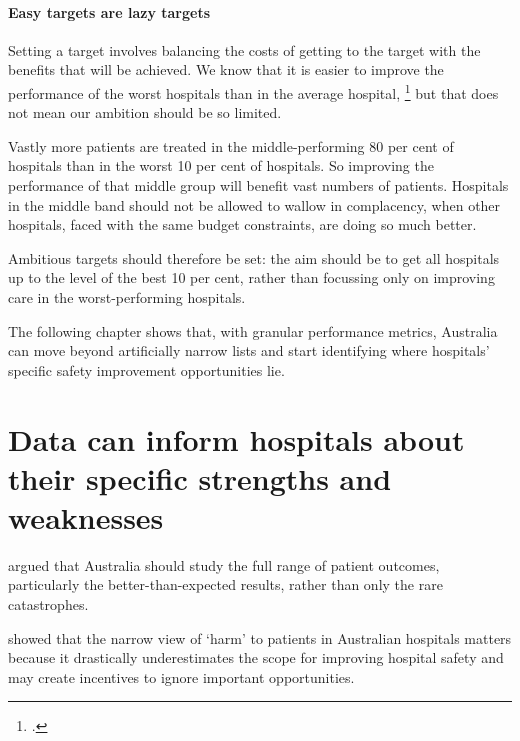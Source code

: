 \documentclass[FrontPage]{grattan}
\begin{document}
\subsubsection{Easy targets are lazy targets}\label{subsubsec:easy-targets-are-lazy-targets}

Setting a target involves balancing the costs of getting to the target with the benefits that will be achieved.
We know that it is easier to improve the performance of the worst hospitals than in the average hospital,%
	\footcites{Ivers_2012}{Mendelson_2017}
but that does not mean our ambition should be so limited.

Vastly more patients are treated in the middle-performing 80 per cent of hospitals than in the worst 10 per cent of hospitals.
So improving the performance of that middle group will benefit vast numbers of patients. 
Hospitals in the middle band should not be allowed to wallow in complacency, when other hospitals, faced with the same budget constraints, are doing so much better.

Ambitious targets should therefore be set: the aim should be to get all hospitals up to the level of the best 10 per cent, rather than focussing only on improving care in the worst-performing hospitals.

The following chapter shows that, with granular performance metrics, Australia can move beyond artificially narrow lists and start identifying where hospitals' specific safety improvement opportunities lie.












\chapter{Data can inform hospitals about their specific strengths and weaknesses}\label{chap:data-can-inform-hospitals-about-their-specific-strengths-and-weaknesses}

 argued that Australia should study the full range of patient outcomes, particularly the better-than-expected results, rather than only the rare catastrophes.

 showed that the narrow view of `harm' to patients in Australian hospitals matters because it drastically underestimates the scope for improving hospital safety and may create incentives to ignore important opportunities.
\end{document}

